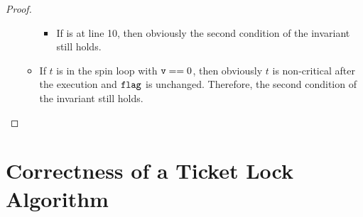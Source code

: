 \documentclass{article}[10pt]
\begin{document}
\begin{proof}
\begin{itemize}
\begin{itemize}
\begin{itemize}
      \item If  is at line 10, then obviously the second
        condition of the invariant still holds.

      \end{itemize}

      \item If $t$ is in the spin loop with $\text{\ttfamily v} == 0$, then obviously
        $t$ is non-critical after the execution and $\text{\ttfamily flag}$ is
        unchanged. Therefore, the second condition of the invariant
        still holds.
    \end{itemize}
  \end{itemize}
  
\end{proof}


\section{Correctness of a Ticket Lock Algorithm}
\label{sec:ticket-lock}
\end{document}
